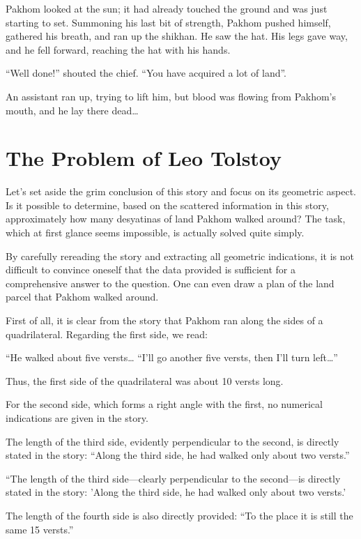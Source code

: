 Pakhom looked at the sun; it had already touched the ground and was just starting to set. Summoning his last bit of strength, Pakhom pushed himself, gathered his breath, and ran up the shikhan. He saw the hat. His legs gave way, and he fell forward, reaching the hat with his hands.

``Well done!'' shouted the chief. ``You have acquired a lot of land''.

An assistant ran up, trying to lift him, but blood was flowing from Pakhom's mouth, and he lay there dead\dots{}


\section{The Problem of Leo Tolstoy}
\label{sec-12.2}

Let's set aside the grim conclusion of this story and focus on its geometric aspect. Is it possible to determine, based on the scattered information in this story, approximately how many desyatinas of land Pakhom walked around? The task, which at first glance seems impossible, is actually solved quite simply.


\ans By carefully rereading the story and extracting all geometric indications, it is not difficult to convince oneself that the data provided is sufficient for a comprehensive answer to the question. One can even draw a plan of the land parcel that Pakhom walked around.

First of all, it is clear from the story that Pakhom ran along the sides of a quadrilateral. Regarding the first side, we read:

``He walked about five versts\dots{} \quad ``I’ll go another five versts, then I’ll turn left\dots{}''

Thus, the first side of the quadrilateral was about 10 versts long.

For the second side, which forms a right angle with the first, no numerical indications are given in the story.

The length of the third side, evidently perpendicular to the second, is directly stated in the story: ``Along the third side, he had walked only about two versts.''

``The length of the third side—clearly perpendicular to the second—is directly stated in the story: 'Along the third side, he had walked only about two versts.'

The length of the fourth side is also directly provided: ``To the place it is still the same 15 versts.''



